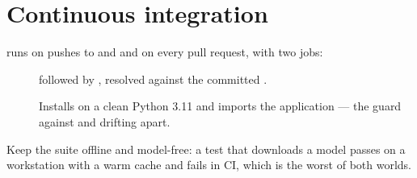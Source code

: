 \section{Continuous integration}

 runs on pushes to  and
 and on every pull request, with two jobs:

\begin{description}
\item[]  followed by ,
resolved against the committed .
\item[] Installs  on a clean Python
3.11 and imports the application --- the guard against  and
 drifting apart.
\end{description}

Keep the suite offline and model-free: a test that downloads a model passes on a
workstation with a warm cache and fails in CI, which is the worst of both worlds.
